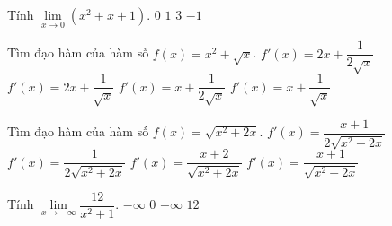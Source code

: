 \begin{ex}%
	Tính $\lim\limits_{x\rightarrow 0}(x^2+x+1)$.
	\choice
	{$0$}
	{\True $1$}
	{$3$}
	{$-1$}
\end{ex}
\begin{ex}%
	Tìm đạo hàm của hàm số $f(x)=x^2+\sqrt{x}$.
	\choice
	{\True $f'(x)=2x+\dfrac{1}{2\sqrt{x}}$}
	{$f'(x)=2x+\dfrac{1}{\sqrt{x}}$}
	{$f'(x)=x+\dfrac{1}{2\sqrt{x}}$}
	{$f'(x)=x+\dfrac{1}{\sqrt{x}}$}
\end{ex}
\begin{ex}%
	Tìm đạo hàm của hàm số $f(x)=\sqrt{x^2+2x}$.
	\choice
	{$f'(x)=\dfrac{x+1}{2\sqrt{x^2+2x}}$}
	{$f'(x)=\dfrac{1}{2\sqrt{x^2+2x}}$}
	{$f'(x)=\dfrac{x+2}{\sqrt{x^2+2x}}$}
	{\True $f'(x)=\dfrac{x+1}{\sqrt{x^2+2x}}$}
\end{ex}
\begin{ex}%
	Tính $\lim\limits_{x\rightarrow-\infty}\dfrac{12}{x^2+1}$.
	\choice
	{$-\infty$}
	{\True $0$}
	{$+\infty$}
	{$12$}
\end{ex}
